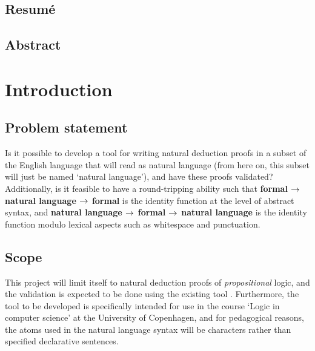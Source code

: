 \documentclass[a4paper]{article}
\title{\tit}
\begin{document}
\begin{titlepage}
\maketitle
\thispagestyle{empty}
\end{titlepage}

\subsection*{Resumé}
\fancyfoot[]{}

\subsection*{Abstract}

\pagebreak
\setcounter{tocdepth}{2}
\tableofcontents
\pagebreak
\lstlistoflistings
\listoffigures
\pagebreak
{}

\section{Introduction} %
\subsection{Problem statement}
    Is it possible to develop a tool for writing natural deduction proofs
    in a subset of the English language that will read as natural language
    (from here on, this subset will just be named `natural language'),
    and have these proofs validated? Additionally, is it feasible to have
    a round-tripping ability such that {\bf formal $\rightarrow$ natural language
    $\rightarrow$ formal} is the identity function at the level of abstract syntax,
    and {\bf natural language $\rightarrow$ formal $\rightarrow$ natural language} is the
    identity function modulo lexical aspects such as whitespace and
    punctuation.

\subsection{Scope}
    This project will limit itself to natural deduction proofs of
    \emph{propositional} logic, and the validation is expected to be done
    using the existing tool \cite{box}. Furthermore, the tool
    to be developed is specifically intended for use in the course `Logic
    in computer science' at the University of Copenhagen, and for  
    pedagogical reasons, the atoms used in the natural language syntax
    will be characters rather than specified declarative sentences.
\end{document}
